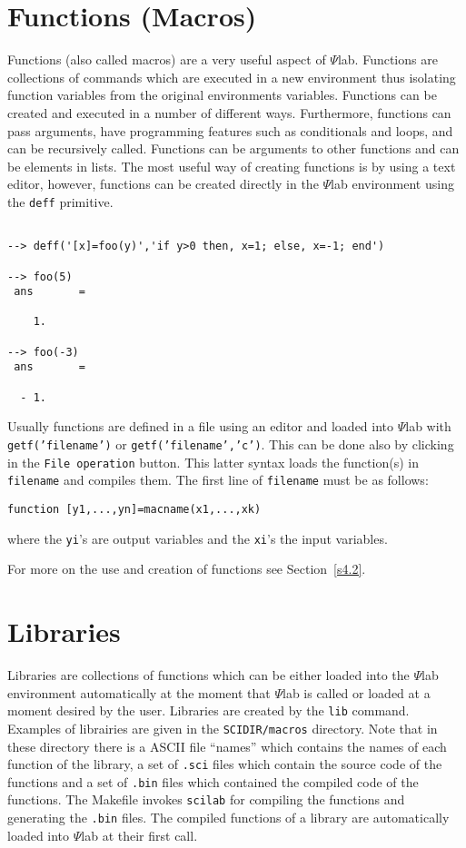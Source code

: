 \section{Functions (Macros)}
\label{s2.6}

	Functions (also called macros) are a very useful aspect 
of $\Psi$lab.  Functions
are collections of commands which are executed in a
new environment thus isolating function variables from the original
environments variables.  Functions
can be created and executed in a number of different ways.
Furthermore, functions can pass arguments, have programming features
such as conditionals and loops, and can be recursively called.
Functions can be arguments
to other functions and can be elements in lists.  The most useful
way of creating functions is by using a text editor, however, functions
can be created directly in the $\Psi$lab environment using the 
{\tt deff} primitive.
\begin{verbatim}
 
--> deff('[x]=foo(y)','if y>0 then, x=1; else, x=-1; end')
 
--> foo(5)
 ans       =
 
    1.  
 
--> foo(-3)
 ans       =
 
  - 1.  
\end{verbatim}
Usually functions are defined in a file using an editor and loaded
into $\Psi$lab with {\tt getf('filename')} or {\tt getf('filename','c')}.
This can be done also by clicking in the {\tt File operation} button.
This latter syntax loads the function(s) in {\tt filename} and compiles
them.
The first line of {\tt filename} must be as follows:
\begin{verbatim}
function [y1,...,yn]=macname(x1,...,xk)
\end{verbatim}
where the {\tt yi}'s are output variables and the {\tt xi}'s the
input variables.

For more on the use and creation of functions see Section~\ref{s4.2}.

\section{Libraries}
\label{s2.7}

	Libraries are collections of functions which can be either loaded
into the $\Psi$lab environment automatically at the moment that 
$\Psi$lab is called or loaded at a moment desired by the user.  
Libraries are created by the {\tt lib} command. Examples of librairies
are given in the {\tt SCIDIR/macros} directory. Note that in these
directory there is a ASCII file ``names'' which contains the names
of each function of the library, a set of {\tt .sci} files which
contain the source code of the functions and a set of {\tt .bin} files
which contained the compiled code of the functions. The Makefile invokes
{\tt scilab} for compiling the functions and generating the {\tt .bin}
files. The compiled functions of a library are automatically loaded 
into $\Psi$lab at their first call.

